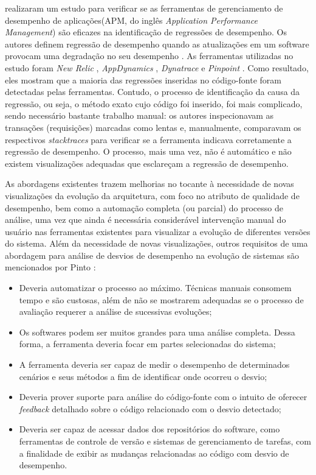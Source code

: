 \citeauthor{Ahmed2016} realizaram um estudo para verificar se as ferramentas de gerenciamento de desempenho de aplicações(APM, do inglês \textit{Application Performance Management}) são eficazes na identificação de regressões de desempenho. Os autores definem regressão de desempenho quando as atualizações em um software provocam uma degradação no seu desempenho \cite{Ahmed2016}. As ferramentas utilizadas no estudo foram \textit{New Relic} \cite{Relic2016}, \textit{AppDynamics} \cite{Appdynamics}, \textit{Dynatrace} \cite{Dynatrace2016} e \textit{Pinpoint} \cite{Pinpoint2016}. Como resultado, eles mostram que a maioria das regressões inseridas no código-fonte foram detectadas pelas ferramentas. Contudo, o processo de identificação da causa da regressão, ou seja, o método exato cujo código foi inserido, foi mais complicado, sendo necessário bastante trabalho manual: os autores inspecionavam as transações (requisições) marcadas como lentas e, manualmente, comparavam os respectivos \textit{stacktraces} para verificar se a ferramenta indicava corretamente a regressão de desempenho. O processo, mais uma vez, não é automático e não existem visualizações adequadas que esclareçam a regressão de desempenho.

As abordagens existentes trazem melhorias no tocante à necessidade de novas visualizações da evolução da arquitetura, com foco no atributo de qualidade de desempenho, bem como a automação completa (ou parcial) do processo de análise, uma vez que ainda é necessária considerável intervenção manual do usuário nas ferramentas existentes para visualizar a evolução de diferentes versões do sistema. Além da necessidade de novas visualizações, outros requisitos de uma abordagem para análise de desvios de desempenho na evolução de sistemas são mencionados por Pinto \cite{Pinto2015}:
\begin{itemize}
	\item Deveria automatizar o processo ao máximo. Técnicas manuais consomem tempo e são custosas, além de não se mostrarem adequadas se o processo de avaliação requerer a análise de sucessivas evoluções;
	\item Os softwares podem ser muitos grandes para uma análise completa. Dessa forma, a ferramenta deveria focar em partes selecionadas do sistema;
	\item A ferramenta deveria ser capaz de medir o desempenho de determinados cenários e seus métodos a fim de identificar onde ocorreu o desvio;
	\item Deveria prover suporte para análise do código-fonte com o intuito de oferecer \textit{feedback} detalhado sobre o código relacionado com o desvio detectado;
	\item Deveria ser capaz de acessar dados dos repositórios do software, como ferramentas de controle de versão e sistemas de gerenciamento de tarefas, com a finalidade de exibir as mudanças relacionadas ao código com desvio de desempenho.
\end{itemize}

